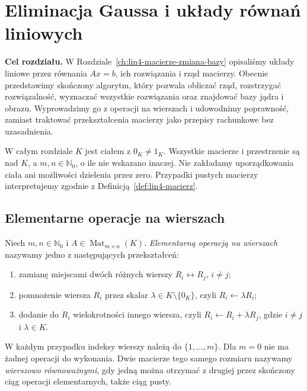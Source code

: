 \chapter{Eliminacja Gaussa i układy równań liniowych}
\label{ch:lin5-eliminacja-gaussa}

\noindent\textbf{Cel rozdziału.}
W Rozdziale~\ref{ch:lin4-macierze-zmiana-bazy}
opisaliśmy układy liniowe przez równania \(Ax=b\),
ich rozwiązania i rząd macierzy.
Obecnie przedstawimy skończony algorytm, który
pozwala obliczać rząd, rozstrzygać rozwiązalność,
wyznaczać wszystkie rozwiązania oraz znajdować
bazy jądra i obrazu. Wyprowadzimy go z operacji
na wierszach i udowodnimy poprawność, zamiast
traktować przekształcenia macierzy jako przepisy
rachunkowe bez uzasadnienia.

W całym rozdziale \(K\) jest ciałem z \(0_K\ne1_K\).
Wszystkie macierze i przestrzenie są nad \(K\),
a \(m,n\in\mathbb N_0\), o ile nie wskazano inaczej.
Nie zakładamy uporządkowania ciała ani możliwości
dzielenia przez zero. Przypadki pustych macierzy
interpretujemy zgodnie z
Definicją~\ref{def:lin4-macierz}.

\section{Elementarne operacje na wierszach}
\label{sec:lin5-operacje-wierszowe}

\begin{definicja}
\label{def:lin5-operacje}
Niech \(m,n\in\mathbb N_0\) i
\(A\in\operatorname{Mat}_{m\times n}(K)\).
\emph{Elementarną operacją na wierszach} nazywamy
jedno z następujących przekształceń:
\begin{enumerate}[label=(\roman*)]
\item zamianę miejscami dwóch różnych wierszy
\(R_i\leftrightarrow R_j\), \(i\ne j\);
\item pomnożenie wiersza \(R_i\) przez skalar
\(\lambda\in K\setminus\{0_K\}\),
czyli \(R_i\leftarrow\lambda R_i\);
\item dodanie do \(R_i\) wielokrotności innego wiersza,
czyli \(R_i\leftarrow R_i+\lambda R_j\), gdzie
\(i\ne j\) i \(\lambda\in K\).
\end{enumerate}
W każdym przypadku indeksy wierszy należą do
\(\{1,\ldots,m\}\). Dla \(m=0\) nie ma
żadnej operacji do wykonania.
Dwie macierze tego samego rozmiaru nazywamy
\emph{wierszowo równoważnymi}, gdy jedną można
otrzymać z drugiej przez skończony ciąg
operacji elementarnych, także ciąg pusty.
\end{definicja}

